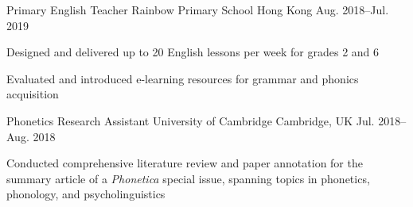 


\begin{cventries}


\cventry
{Primary English Teacher} %
{Rainbow Primary School} %
{Hong Kong} %
{Aug. 2018--Jul. 2019} %
{ %
\begin{cvitems}
\item {Designed and delivered up to 20 English lessons per week for grades 2 and 6}
\item {Evaluated and introduced e-learning resources for grammar and phonics acquisition}
\end{cvitems}
}


\cventry
{Phonetics Research Assistant} %
{University of Cambridge} %
{Cambridge, UK} %
{Jul. 2018--Aug. 2018} %
{ %
\begin{cvitems}
\item {Conducted comprehensive literature review and paper annotation for the summary article of a \textit{Phonetica} special issue, spanning topics in phonetics, phonology, and psycholinguistics}
\end{cvitems}
}


\end{cventries}